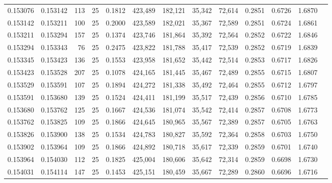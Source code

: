 \begin{tabular}{rrrrrrrrrrrrr}
0.153076 & 0.153142 &   113 &  25 &                                     0.1812 & 423,489 & 182,121 &  35,342 &  72,614 & 0.2851 & 0.6726 & 1.6870 \\
0.153142 & 0.153211 &   100 &  25 &                                     0.2000 & 423,589 & 182,021 &  35,367 &  72,589 & 0.2851 & 0.6724 & 1.6861 \\
0.153211 & 0.153294 &   157 &  25 &                                     0.1374 & 423,746 & 181,864 &  35,392 &  72,564 & 0.2852 & 0.6722 & 1.6846 \\
0.153294 & 0.153343 &    76 &  25 &                                     0.2475 & 423,822 & 181,788 &  35,417 &  72,539 & 0.2852 & 0.6719 & 1.6839 \\
0.153345 & 0.153423 &   136 &  25 &                                     0.1553 & 423,958 & 181,652 &  35,442 &  72,514 & 0.2853 & 0.6717 & 1.6826 \\
0.153423 & 0.153528 &   207 &  25 &                                     0.1078 & 424,165 & 181,445 &  35,467 &  72,489 & 0.2855 & 0.6715 & 1.6807 \\
0.153529 & 0.153591 &   107 &  25 &                                     0.1894 & 424,272 & 181,338 &  35,492 &  72,464 & 0.2855 & 0.6712 & 1.6797 \\
0.153591 & 0.153680 &   139 &  25 &                                     0.1524 & 424,411 & 181,199 &  35,517 &  72,439 & 0.2856 & 0.6710 & 1.6785 \\
0.153680 & 0.153762 &   125 &  25 &                                     0.1667 & 424,536 & 181,074 &  35,542 &  72,414 & 0.2857 & 0.6708 & 1.6773 \\
0.153762 & 0.153825 &   109 &  25 &                                     0.1866 & 424,645 & 180,965 &  35,567 &  72,389 & 0.2857 & 0.6705 & 1.6763 \\
0.153826 & 0.153900 &   138 &  25 &                                     0.1534 & 424,783 & 180,827 &  35,592 &  72,364 & 0.2858 & 0.6703 & 1.6750 \\
0.153902 & 0.153964 &   109 &  25 &                                     0.1866 & 424,892 & 180,718 &  35,617 &  72,339 & 0.2859 & 0.6701 & 1.6740 \\
0.153964 & 0.154030 &   112 &  25 &                                     0.1825 & 425,004 & 180,606 &  35,642 &  72,314 & 0.2859 & 0.6698 & 1.6730 \\
0.154031 & 0.154114 &   147 &  25 &                                     0.1453 & 425,151 & 180,459 &  35,667 &  72,289 & 0.2860 & 0.6696 & 1.6716 \\

\end{tabular}
